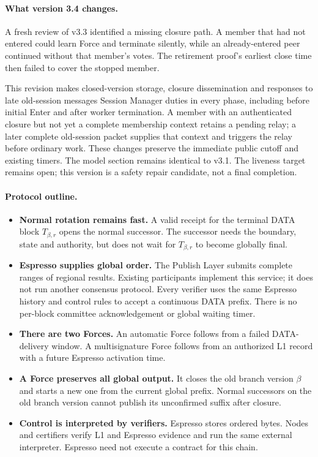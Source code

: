 \documentclass[11pt,a4paper]{article}
\newcounter{protocol}
\begin{document}
\paragraph{What version 3.4 changes.}
A fresh review of v3.3 identified a missing closure path. A member that
had not entered could learn Force and terminate silently, while an
already-entered peer continued without that member's votes. The retirement
proof's earliest close time then failed to cover the stopped member.

This revision makes closed-version storage, closure dissemination and
responses to late old-session messages Session Manager duties in every
phase, including before initial Enter and after worker termination.
A member with an authenticated closure but not yet a complete membership
context retains a pending relay; a later complete old-session packet
supplies that context and triggers the relay before ordinary work.
These changes preserve the immediate public cutoff and existing timers.
The model section remains identical to v3.1. The liveness target remains
open; this version is a safety repair candidate, not a final completion.

\paragraph{Protocol outline.}
\begin{itemize}
\item \textbf{Normal rotation remains fast.} A valid receipt for the
terminal DATA block $T_{\beta,r}$ opens the normal successor. The successor
needs the boundary, state and authority, but does not wait for $T_{\beta,r}$
to become globally final.
\item \textbf{Espresso supplies global order.} The Publish Layer submits
complete ranges of regional results. Existing participants implement this
service; it does not run another consensus protocol. Every verifier uses the same
Espresso history and control rules to accept a continuous DATA prefix.
There is no per-block committee acknowledgement or global waiting timer.
\item \textbf{There are two Forces.} An automatic Force follows from
a failed DATA-delivery window. A multisignature Force follows from an
authorized L1 record with a future Espresso activation time.
\item \textbf{A Force preserves all global output.} It closes the old
branch version $\beta$ and starts a new one from the current
global prefix. Normal successors on the old branch version cannot publish its
unconfirmed suffix after closure.
\item \textbf{Control is interpreted by verifiers.} Espresso stores
ordered bytes. Nodes and certifiers verify L1 and Espresso evidence and
run the same external interpreter. Espresso need not execute a contract
for this chain.
\end{itemize}
\end{document}
